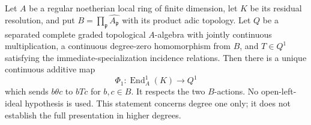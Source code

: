 \begin{theorem}
Let $A$ be a regular noetherian local ring of finite dimension, let
$K$ be its residual resolution, and put
$B=\prod_{\mathfrak p}\widehat{A_{\mathfrak p}}$ with its product
adic topology. Let $Q$ be a separated complete graded topological
$A$-algebra with jointly continuous multiplication, a continuous
degree-zero homomorphism from $B$, and $T\in Q^1$ satisfying the
immediate-specialization incidence relations. Then there is a unique
continuous additive map
\[
 \Phi_1:\operatorname{End}_A^1(K)\longrightarrow Q^1
\]
which sends $b\theta c$ to $bTc$ for $b,c\in B$.
It respects the two $B$-actions. No open-left-ideal hypothesis is used.
This statement concerns degree one only; it does not establish the
full presentation in higher degrees.
\end{theorem}
